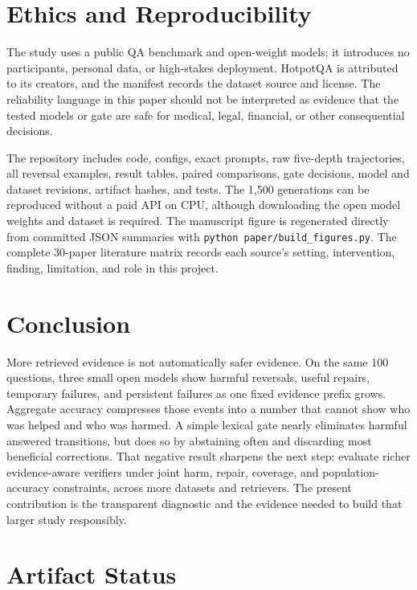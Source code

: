 \documentclass[10pt,twocolumn]{article}
\begin{document}
\section{Ethics and Reproducibility}

The study uses a public QA benchmark and open-weight models; it introduces no participants, personal data, or high-stakes deployment. HotpotQA is attributed to its creators, and the manifest records the dataset source and license. The reliability language in this paper should not be interpreted as evidence that the tested models or gate are safe for medical, legal, financial, or other consequential decisions.

The repository includes code, configs, exact prompts, raw five-depth trajectories, all reversal examples, result tables, paired comparisons, gate decisions, model and dataset revisions, artifact hashes, and tests. The 1,500 generations can be reproduced without a paid API on CPU, although downloading the open model weights and dataset is required. The manuscript figure is regenerated directly from committed JSON summaries with \texttt{python paper/build\_figures.py}. The complete 30-paper literature matrix records each source's setting, intervention, finding, limitation, and role in this project.

\section{Conclusion}

More retrieved evidence is not automatically safer evidence. On the same 100 questions, three small open models show harmful reversals, useful repairs, temporary failures, and persistent failures as one fixed evidence prefix grows. Aggregate accuracy compresses those events into a number that cannot show who was helped and who was harmed. A simple lexical gate nearly eliminates harmful answered transitions, but does so by abstaining often and discarding most beneficial corrections. That negative result sharpens the next step: evaluate richer evidence-aware verifiers under joint harm, repair, coverage, and population-accuracy constraints, across more datasets and retrievers. The present contribution is the transparent diagnostic and the evidence needed to build that larger study responsibly.

\section*{Artifact Status}
\end{document}
